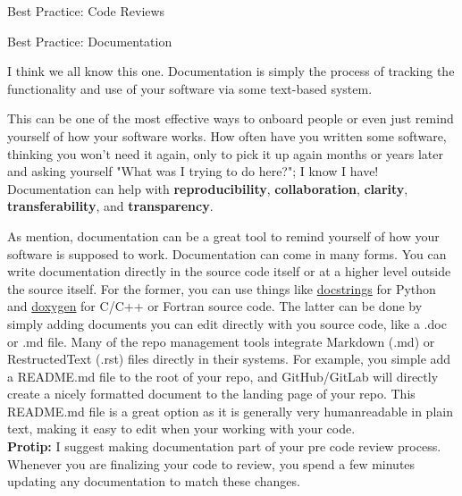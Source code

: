 \documentclass[final]{beamer}
\newlength{\colwidth}
\begin{document}
\begin{frame}[t]
\begin{columns}[t]
\begin{column}{\colwidth}
\begin{block}{Best Practice: Code Reviews}
  \end{block}

  \begin{block}{Best Practice: Documentation}

    I think we all know this one.
    Documentation is simply the process of tracking the functionality and use
    of your software via some text-based system.


    This can be one of the most effective ways to onboard people or even just
    remind yourself of how your software works.
    How often have you written some software, thinking you won't need it again,
    only to pick it up again months or years later and asking yourself "What was
    I trying to do here?"; I know I have!
    Documentation can help with \textbf{reproducibility},
    \textbf{collaboration}, \textbf{clarity}, \textbf{transferability}, and
    \textbf{transparency}.

    As mention, documentation can be a great tool to remind yourself of how your
    software is supposed to work.
    Documentation can come in many forms.
    You can write documentation directly in the source code itself or at a
    higher level outside the source itself.
    For the former, you can use things like
    \href{https://realpython.com/documenting-python-code/}{docstrings} for
    Python and \href{https://www.doxygen.nl/manual/docblocks.html}{doxygen} for
    C/C++ or Fortran source code.
    The latter can be done by simply adding documents you can edit directly
    with you source code, like a .doc or .md file.
    Many of the repo management tools integrate Markdown (.md) or RestructedText
    (.rst) files directly in their systems.
    For example, you simple add a README.md file to the root of your repo, and
    GitHub/GitLab will directly create a nicely formatted document to the
    landing page of your repo.
    This README.md file is a great option as it is generally very humanreadable
    in plain text, making it easy to edit when your working with your code.
    \\ \vspace{1em}
    \textbf{Protip:} I suggest making documentation part of your pre code review
    process. Whenever you are finalizing your code to review, you spend a few
    minutes updating any documentation to match these changes.
    \\ \vspace{1em}



\end{block}
\end{column}
\end{columns}
\end{frame}
\end{document}
